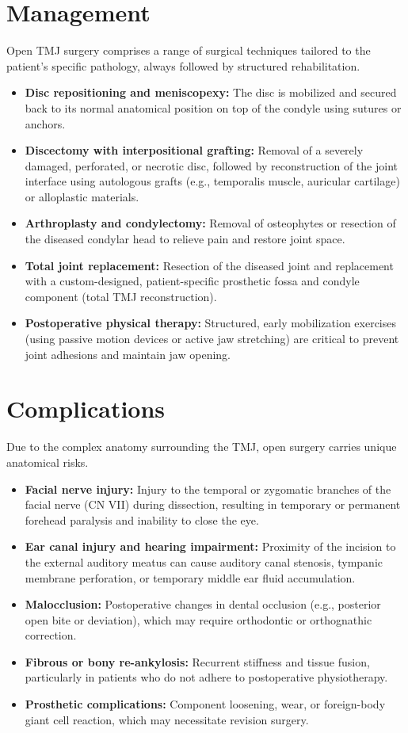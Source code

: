 \section*{Management}
Open TMJ surgery comprises a range of surgical techniques tailored to the patient's specific pathology, always followed by structured rehabilitation.
\begin{itemize}
    \item \textbf{Disc repositioning and meniscopexy:} The disc is mobilized and secured back to its normal anatomical position on top of the condyle using sutures or anchors.
    \item \textbf{Discectomy with interpositional grafting:} Removal of a severely damaged, perforated, or necrotic disc, followed by reconstruction of the joint interface using autologous grafts (e.g., temporalis muscle, auricular cartilage) or alloplastic materials.
    \item \textbf{Arthroplasty and condylectomy:} Removal of osteophytes or resection of the diseased condylar head to relieve pain and restore joint space.
    \item \textbf{Total joint replacement:} Resection of the diseased joint and replacement with a custom-designed, patient-specific prosthetic fossa and condyle component (total TMJ reconstruction).
    \item \textbf{Postoperative physical therapy:} Structured, early mobilization exercises (using passive motion devices or active jaw stretching) are critical to prevent joint adhesions and maintain jaw opening.
\end{itemize}

\section*{Complications}
Due to the complex anatomy surrounding the TMJ, open surgery carries unique anatomical risks.
\begin{itemize}
    \item \textbf{Facial nerve injury:} Injury to the temporal or zygomatic branches of the facial nerve (CN VII) during dissection, resulting in temporary or permanent forehead paralysis and inability to close the eye.
    \item \textbf{Ear canal injury and hearing impairment:} Proximity of the incision to the external auditory meatus can cause auditory canal stenosis, tympanic membrane perforation, or temporary middle ear fluid accumulation.
    \item \textbf{Malocclusion:} Postoperative changes in dental occlusion (e.g., posterior open bite or deviation), which may require orthodontic or orthognathic correction.
    \item \textbf{Fibrous or bony re-ankylosis:} Recurrent stiffness and tissue fusion, particularly in patients who do not adhere to postoperative physiotherapy.
    \item \textbf{Prosthetic complications:} Component loosening, wear, or foreign-body giant cell reaction, which may necessitate revision surgery.
\end{itemize}

